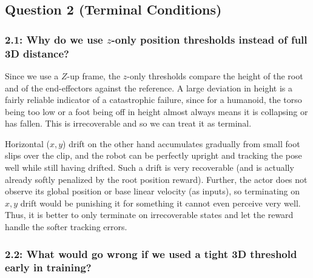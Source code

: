 \documentclass[12pt]{article}
\begin{document}
\subsection*{Question 2 (Terminal Conditions)}

\subsubsection*{2.1: Why do we use $z$-only position thresholds instead of full 3D distance?}
\begin{solution}[height=7cm]
Since we use a $Z$-up frame, the $z$-only thresholds compare the height of the root and of the end-effectors against the reference. A large deviation in height is a fairly reliable indicator of a catastrophic failure, since for a humanoid, the torso being too low or a foot being off in height almost always means it is collapsing or has fallen. This is irrecoverable and so we can treat it as terminal.

Horizontal ($x,y$) drift on the other hand accumulates gradually from small foot slips over the clip, and the robot can be perfectly upright and tracking the pose well while still having drifted. Such a drift is very recoverable (and is actually already softly penalized by the root position reward). Further, the actor does not observe its global position or base linear velocity (as inputs), so terminating on $x,y$ drift would be punishing it for something it cannot even perceive very well. Thus, it is better to only terminate on irrecoverable states and let the reward handle the softer tracking errors.
\end{solution}

\subsubsection*{2.2: What would go wrong if we used a tight 3D threshold early in training?}
\begin{solution}[height=7cm, overlay unbroken and last={\node[anchor=north west, inner sep=0pt, text width=\tcbtextwidth, align=justify]
  at ([xshift=5mm, yshift=-3mm]interior.north west) {%
The policy is random at the beginning of training, and so a tight 3D threshold would end almost every episode within a few steps, including from harmless $x,y$ drift. The returns would then be uniformly short and similar across actions, so the advantage estimates would be close to zero and noisy, which would in turn give PPO a very weak signal about which actions are actually better. The collected data would also be concentrated at the very start of each episode, so the policy would rarely reach later frames of the motion (and not get learning signal for longer horizons thereby), and the adaptive sampling would also not have any useful contrast since every part of the clip would be failing. This creates a bootstrapping/chicken-and-egg problem, where the policy needs to already be good in order to survive and collect useful data, but it needs that data to get good in the first place. A looser threshold effectively acts as a curriculum that tolerates poor tracking early on.
};}]
\end{solution}
\end{document}
